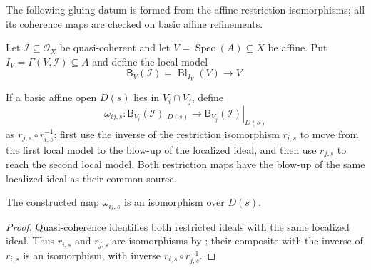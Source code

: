 The following gluing datum is formed from the affine restriction isomorphisms;
all its coherence maps are checked on basic affine refinements.

\begin{definition}
  \label{def:nagata-global-blowup-local-model}

  Let $\mathcal I\subseteq\mathcal O_X$ be quasi-coherent and let
  $V=\operatorname{Spec}(A)\subseteq X$ be affine.  Put
  $I_V=\Gamma(V,\mathcal I)\subseteq A$ and define the local model
  \[
    \mathsf B_V(\mathcal I)=\operatorname{Bl}_{I_V}(V)\longrightarrow V.
  \]
\end{definition}

\begin{definition}
  \label{def:nagata-global-blowup-overlap-basic-map}

  If a basic affine open $D(s)$ lies in $V_i\cap V_j$, define
  \[
    \omega_{ij,s}\colon
      \mathsf B_{V_i}(\mathcal I)|_{D(s)}
      \longrightarrow
      \mathsf B_{V_j}(\mathcal I)|_{D(s)}
  \]
  as $r_{j,s}\circ r_{i,s}^{-1}$: first use the inverse of the restriction
  isomorphism $r_{i,s}$ to move from the first local model to the blow-up of
  the localized ideal, and then use $r_{j,s}$ to reach the second local model.
  Both restriction maps have the blow-up of the same localized ideal as their
  common source.
\end{definition}

\begin{lemma}
  \label{lemma:nagata-global-blowup-overlap-basic}

  The constructed map $\omega_{ij,s}$ is an isomorphism over $D(s)$.
\end{lemma}

\begin{proof}
  Quasi-coherence identifies both restricted ideals with the same localized
  ideal.  Thus $r_{i,s}$ and $r_{j,s}$ are isomorphisms by
  ; their composite with the inverse
  of $r_{i,s}$ is an isomorphism, with inverse $r_{i,s}\circ r_{j,s}^{-1}$.
\end{proof}


